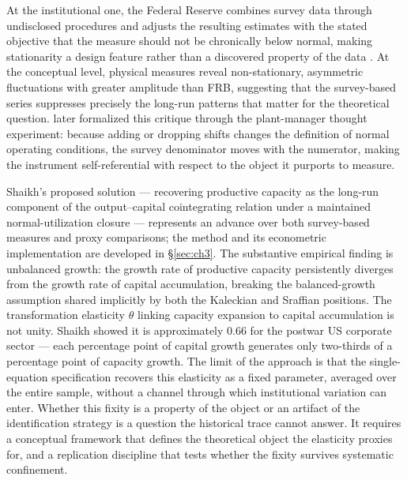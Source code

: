 \documentclass[11pt,a4paper]{article}
\begin{document}
At the institutional one, the Federal
Reserve combines survey data through undisclosed procedures and adjusts the
resulting estimates with the stated objective that the measure should not be
chronically below normal, making stationarity a design feature rather than a
discovered property of the data \citep[pp.~187--188]{Shapiro1989}. At the
conceptual level, physical measures reveal non-stationary, asymmetric
fluctuations with greater amplitude than FRB, suggesting that the
survey-based series suppresses precisely the long-run patterns that matter
for the theoretical question. \citet{Nikiforos2016} later formalized this
critique through the plant-manager thought experiment: because adding or
dropping shifts changes the definition of normal operating conditions, the
survey denominator moves with the numerator, making the instrument
self-referential with respect to the object it purports to measure.




Shaikh's proposed solution --- recovering productive capacity as the
long-run component of the output--capital cointegrating relation under a
maintained normal-utilization closure --- represents an advance over both
survey-based measures and proxy comparisons; the method and its econometric
implementation are developed in \S\ref{sec:ch3}. The substantive empirical
finding is unbalanced growth: the growth rate of productive capacity
persistently diverges from the growth rate of capital accumulation, breaking
the balanced-growth assumption shared implicitly by both the Kaleckian and
Sraffian positions. The transformation elasticity $\theta$ linking capacity
expansion to capital accumulation is not unity. Shaikh showed it is
approximately 0.66 for the postwar US corporate sector --- each percentage
point of capital growth generates only two-thirds of a percentage point of
capacity growth. The limit of the approach is that the single-equation
specification recovers this elasticity as a fixed parameter, averaged over
the entire sample, without a channel through which institutional variation
can enter. Whether this fixity is a property of the object or an artifact
of the identification strategy is a question the historical trace cannot
answer. It requires a conceptual framework that defines the theoretical
object the elasticity proxies for, and a replication discipline that tests
whether the fixity survives systematic confinement.
\end{document}

